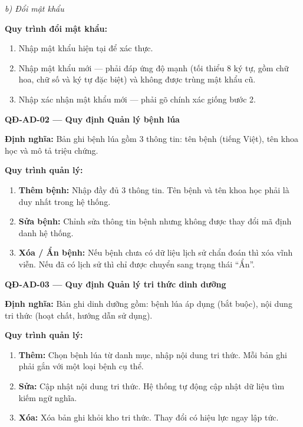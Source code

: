 \documentclass[12pt,a4paper]{article}
\begin{document}
\noindent\textit{b) Đổi mật khẩu}

\noindent\textbf{Quy trình đổi mật khẩu:}
\begin{enumerate}
    \item Nhập mật khẩu hiện tại để xác thực.
    \item Nhập mật khẩu mới --- phải đáp ứng độ mạnh (tối thiểu 8 ký tự, gồm chữ hoa, chữ số và ký tự đặc biệt) và không được trùng mật khẩu cũ.
    \item Nhập xác nhận mật khẩu mới --- phải gõ chính xác giống bước 2.
\end{enumerate}

\vspace{0.3cm}
\noindent\textbf{QĐ-AD-02 --- Quy định Quản lý bệnh lúa}

\noindent\textbf{Định nghĩa:} Bản ghi bệnh lúa gồm 3 thông tin: tên bệnh (tiếng Việt), tên khoa học và mô tả triệu chứng.

\noindent\textbf{Quy trình quản lý:}
\begin{enumerate}
    \item \textbf{Thêm bệnh:} Nhập đầy đủ 3 thông tin. Tên bệnh và tên khoa học phải là duy nhất trong hệ thống.
    \item \textbf{Sửa bệnh:} Chỉnh sửa thông tin bệnh nhưng không được thay đổi mã định danh hệ thống.
    \item \textbf{Xóa / Ẩn bệnh:} Nếu bệnh chưa có dữ liệu lịch sử chẩn đoán thì xóa vĩnh viễn. Nếu đã có lịch sử thì chỉ được chuyển sang trạng thái ``Ẩn''.
\end{enumerate}

\vspace{0.3cm}
\noindent\textbf{QĐ-AD-03 --- Quy định Quản lý tri thức dinh dưỡng}

\noindent\textbf{Định nghĩa:} Bản ghi dinh dưỡng gồm: bệnh lúa áp dụng (bắt buộc), nội dung tri thức (hoạt chất, hướng dẫn sử dụng).

\noindent\textbf{Quy trình quản lý:}
\begin{enumerate}
    \item \textbf{Thêm:} Chọn bệnh lúa từ danh mục, nhập nội dung tri thức. Mỗi bản ghi phải gắn với một loại bệnh cụ thể.
    \item \textbf{Sửa:} Cập nhật nội dung tri thức. Hệ thống tự động cập nhật dữ liệu tìm kiếm ngữ nghĩa.
    \item \textbf{Xóa:} Xóa bản ghi khỏi kho tri thức. Thay đổi có hiệu lực ngay lập tức.
\end{enumerate}
\end{document}
